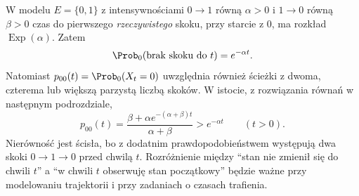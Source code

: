 \begin{przyklad}
W modelu $E=\{0,1\}$ z intensywnościami
$0\to1$ równą $\alpha>0$ i $1\to0$ równą $\beta>0$
czas do pierwszego \emph{rzeczywistego} skoku, przy starcie
z $0$, ma rozkład $\operatorname{Exp}(\alpha)$. Zatem
\[
\Prob_0(\text{brak skoku do }t)=e^{-\alpha t}.
\]
Natomiast $p_{00}(t)=\Prob_0(X_t=0)$ uwzględnia również
ścieżki z dwoma, czterema lub większą parzystą liczbą skoków.
W istocie, z rozwiązania równań w następnym podrozdziale,
\[
 p_{00}(t)=\frac{\beta+\alpha e^{-(\alpha+\beta)t}}
 {\alpha+\beta}>e^{-\alpha t}\qquad(t>0).
\]
Nierówność jest ścisła, bo z dodatnim prawdopodobieństwem
występują dwa skoki $0\to1\to0$ przed chwilą $t$.
Rozróżnienie między ``stan nie zmienił się do chwili $t$''
a ``w chwili $t$ obserwuję stan początkowy'' będzie ważne
przy modelowaniu trajektorii i przy zadaniach o czasach trafienia.
\end{przyklad}


